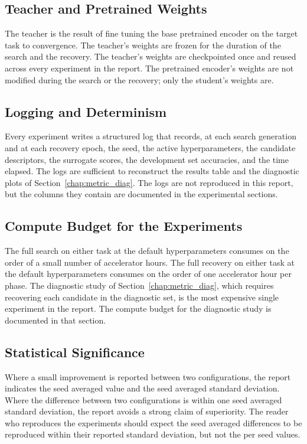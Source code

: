 \subsection{Teacher and Pretrained Weights}

The teacher is the result of fine tuning the base pretrained encoder on the target task to convergence. The teacher's weights are frozen for the duration of the search and the recovery. The teacher's weights are checkpointed once and reused across every experiment in the report. The pretrained encoder's weights are not modified during the search or the recovery; only the student's weights are.

\subsection{Logging and Determinism}

Every experiment writes a structured log that records, at each search generation and at each recovery epoch, the seed, the active hyperparameters, the candidate descriptors, the surrogate scores, the development set accuracies, and the time elapsed. The logs are sufficient to reconstruct the results table and the diagnostic plots of Section~\ref{chap:metric_diag}. The logs are not reproduced in this report, but the columns they contain are documented in the experimental sections.

\subsection{Compute Budget for the Experiments}

The full search on either task at the default hyperparameters consumes on the order of a small number of accelerator hours. The full recovery on either task at the default hyperparameters consumes on the order of one accelerator hour per phase. The diagnostic study of Section~\ref{chap:metric_diag}, which requires recovering each candidate in the diagnostic set, is the most expensive single experiment in the report. The compute budget for the diagnostic study is documented in that section.

\subsection{Statistical Significance}

Where a small improvement is reported between two configurations, the report indicates the seed averaged value and the seed averaged standard deviation. Where the difference between two configurations is within one seed averaged standard deviation, the report avoids a strong claim of superiority. The reader who reproduces the experiments should expect the seed averaged differences to be reproduced within their reported standard deviation, but not the per seed values.
